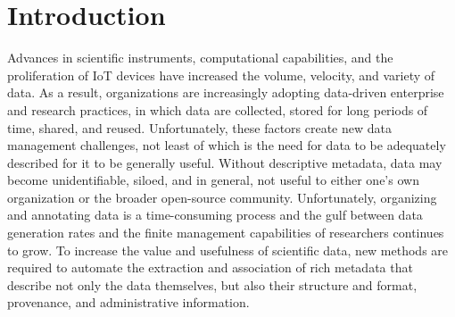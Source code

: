\documentclass[sigconf]{acmart}
\begin{document}
\section{Introduction}


Advances in scientific instruments, computational capabilities, and the proliferation of IoT devices
have increased the volume, velocity, and variety of data. 
As a result, organizations are increasingly adopting data-driven enterprise and research practices, 
in which data are collected, stored for long periods of time, shared, 
and reused.
Unfortunately, these factors create new data management challenges, 
not least of which is the need for data to be adequately described
for it to be generally useful. Without descriptive metadata, data
may become unidentifiable, siloed, and in general, 
not useful to either one's own organization or the broader open-source community. 
Unfortunately, organizing and annotating data is a time-consuming process
and the gulf between data generation rates
and the finite management capabilities of researchers
continues to grow. To increase the value and usefulness of scientific data, 
new methods are required to automate the extraction and association 
of rich metadata that describe not only the data themselves, but
also their structure and format, provenance, and administrative information.

\end{document}
